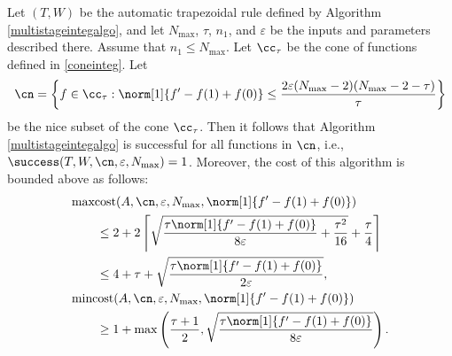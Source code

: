 \begin{theorem} \label{multistageintegthm} Let $(T,W)$ be the automatic trapezoidal rule defined by Algorithm \ref{multistageintegalgo}, and let  $N_{\max}$, $\tau$, $n_1$, and $\varepsilon$ be the inputs and parameters described there.  Assume that $n_1 \le N_{\max}$.  Let $\cc_\tau$ be the cone of functions defined in \eqref{coneinteg}.  Let
$$
\cn
= \left \{ f \in \cc_\tau : \norm[1]{f'-f(1)+f(0)} \le \frac{2\varepsilon (N_{\max}-2)(N_{\max}-2 -\tau)}{\tau} \right\}
$$
be the nice subset of the cone $\cc_\tau$.  Then it follows that Algorithm \ref{multistageintegalgo} is successful for all functions in $\cn$,  i.e.,  $\success(T,W,\cn,\varepsilon,N_{\max}) = 1$.  Moreover, the cost of this algorithm is bounded above as follows:
\begin{align*}
\MoveEqLeft{\maxcost(A,\cn,\varepsilon,N_{\max},\norm[1]{f'-f(1)+f(0)})}\\
&\le 2+2 \left \lceil \sqrt{\frac{\tau \norm[1]{f'-f(1)+f(0)}}{8\varepsilon} + \frac{\tau^2 }{16}} + \frac{\tau}{4} \right\rceil \\
&\le 4+ \tau + \sqrt{\frac{\tau \norm[1]{f'-f(1)+f(0)}}{2\varepsilon}}, \\
\MoveEqLeft{\mincost(A,\cn,\varepsilon,N_{\max},\norm[1]{f'-f(1)+f(0)})}\\ 
& \ge 1+ \max\left(\frac{\tau+1}{2}, \sqrt{\frac{\tau \norm[1]{f'-f(1)+f(0)}}{8 \varepsilon}} \right) .
\end{align*}
\end{theorem}


